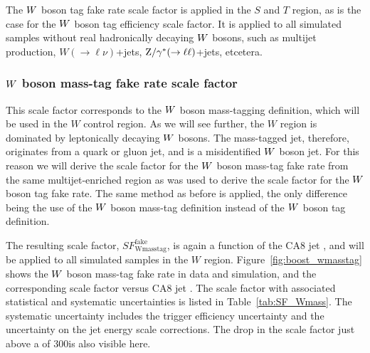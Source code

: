 The $W$ boson tag fake rate scale factor is applied in the $S$ and $T$ region, as is the case for
the $W$ boson tag efficiency scale factor. It is applied to all simulated samples without real
hadronically decaying $W$ bosons, such as multijet production, $W(\rightarrow\ell\nu)$+jets,
$\mathrm{Z}/\gamma^*(\rightarrow\ell\ell)$+jets, etcetera. 


\subsubsection{\texorpdfstring{$W$}{W} boson mass-tag fake rate scale factor
\label{sec:wmasstag_fake_sf}}

This scale factor corresponds to the $W$ boson mass-tagging definition, which will be used in the
$W$ control region. As we will see further, the $W$ region is dominated by leptonically decaying
$W$ bosons. The mass-tagged jet, therefore, originates from a quark or gluon jet, and is a
misidentified $W$ boson jet. For this reason we will derive the scale factor for the $W$ boson
mass-tag fake rate from the same multijet-enriched region as was used to derive the scale factor for
the $W$ boson tag fake rate. The same method as before is applied, the only difference being
the use of the $W$ boson mass-tag definition instead of the $W$ boson tag definition. 

The resulting scale factor, $SF_\textrm{Wmasstag}^\textrm{fake}$, is again a function of the CA8
jet \pt, and will be applied to all simulated samples in the $W$ region.
Figure~\ref{fig:boost_wmasstag} shows the $W$ boson mass-tag fake rate in data and
simulation, and the corresponding scale factor versus CA8 jet \pt. The scale factor with
associated statistical and systematic uncertainties is listed in Table~\ref{tab:SF_Wmass}. The
systematic uncertainty includes the trigger efficiency uncertainty and the uncertainty on the jet
energy scale corrections. 
The drop in the scale factor just above a \pt of 300\GeV is also visible here. 

